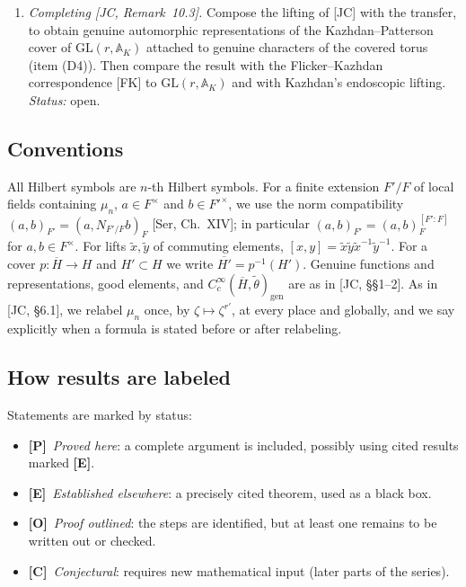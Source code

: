 \documentclass[12pt]{article}
\newcommand{\ov}[1]{\overline{#1}}
\newcommand{\A}{\mathbb{A}}
\newcommand{\gen}{\mathrm{gen}}
\newcommand{\GL}{\mathrm{GL}}
\newcommand{\Pv}{\textbf{[P]}}
\newcommand{\Ev}{\textbf{[E]}}
\newcommand{\Ov}{\textbf{[O]}}
\newcommand{\Cv}{\textbf{[C]}}
\theoremstyle{plain}
\theoremstyle{definition}
\begin{document}
\begin{enumerate}[label=(\roman*)]
\item \emph{Completing [JC, Remark~10.3].} Compose the lifting of [JC] with the transfer, to obtain genuine automorphic representations of the Kazhdan--Patterson cover of $\GL(r,\A_K)$ attached to genuine characters of the covered torus (item (D4)). Then compare the result with the Flicker--Kazhdan correspondence [FK] to $\GL(r,\A_K)$ and with Kazhdan's endoscopic lifting. \emph{Status:} open.
\end{enumerate}

\subsection{Conventions}
All Hilbert symbols are $n$-th Hilbert symbols. For a finite extension $F'/F$ of local fields containing $\mu_n$, $a\in F^\times$ and $b\in F'^\times$, we use the norm compatibility $(a,b)_{F'}=(a,N_{F'/F}b)_F$ [Ser, Ch.~XIV]; in particular $(a,b)_{F'}=(a,b)_F^{[F':F]}$ for $a,b\in F^\times$. For lifts $\tilde x,\tilde y$ of commuting elements, $[x,y]=\tilde x\tilde y\tilde x^{-1}\tilde y^{-1}$. For a cover $p:\ov H\to H$ and $H'\subset H$ we write $\ov{H'}=p^{-1}(H')$. Genuine functions and representations, good elements, and $C_c^\infty(\ov H,\tilde\theta)_\gen$ are as in [JC, \S\S1--2]. As in [JC, \S6.1], we relabel $\mu_n$ once, by $\zeta\mapsto\zeta^{r'}$, at every place and globally, and we say explicitly when a formula is stated before or after relabeling.

\subsection{How results are labeled}
Statements are marked by status:
\begin{itemize}
\item \Pv\ \emph{Proved here}: a complete argument is included, possibly using cited results marked \Ev.
\item \Ev\ \emph{Established elsewhere}: a precisely cited theorem, used as a black box.
\item \Ov\ \emph{Proof outlined}: the steps are identified, but at least one remains to be written out or checked.
\item \Cv\ \emph{Conjectural}: requires new mathematical input (later parts of the series).
\end{itemize}
\end{document}
